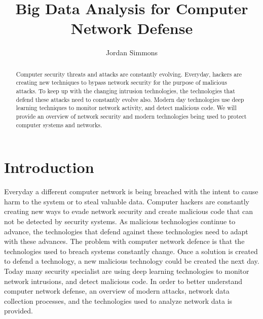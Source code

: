 \documentclass[sigconf]{acmart}
\begin{document}
\title{Big Data Analysis for Computer Network Defense}

\author{Jordan Simmons}


\renewcommand{\shortauthors}{G. v. Laszewski}


\begin{abstract}
Computer security threats and attacks are constantly evolving. Everyday, hackers are creating new techniques to bypass
network security for the purpose of malicious attacks. To keep up with the changing intrusion technologies, the technologies that defend these attacks need to constantly evolve also. Modern day technologies use deep learning techniques to monitor network activity, and detect malicious code. We will provide an overview of network security and modern technologies being used to protect computer systems and networks.
\end{abstract}



\maketitle

\section{Introduction}

Everyday a different computer network is being breached with the intent to cause harm to the system or to steal valuable data. Computer hackers are constantly creating new ways to evade network security and create malicious code that can not be detected by security systems. As malicious technologies continue to advance, the technologies that defend against these technologies need to adapt with these advances. The problem with computer network defence is that the technologies used to breach systems constantly change. Once a solution is created to defend a technology, a new malicious technology could be created the next day. Today many security specialist are using deep learning technologies to monitor network intrusions, and detect malicious code. In order to better understand computer network defense, an overview of modern attacks, network data collection processes, and the technologies used to analyze network data is provided. 
\end{document}
